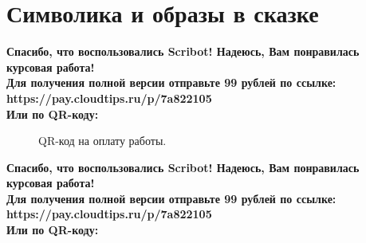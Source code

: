 \documentclass{article}
\begin{document}
\section{Символика и образы в сказке}
\begin{center}
    \textbf{
        Спасибо, что воспользовались Scribot! Надеюсь, Вам понравилась курсовая работа!\\
        Для получения полной версии отправьте 99 рублей по ссылке:\\
        https://pay.cloudtips.ru/p/7a822105\\
        Или по QR-коду:\\
    }
\end{center}
\begin{figure}[h]
    \caption{QR-код на оплату работы.}
    \label{ris:image}
\end{figure}
\newpage
\begin{center}
    \textbf{
        Спасибо, что воспользовались Scribot! Надеюсь, Вам понравилась курсовая работа!\\
        Для получения полной версии отправьте 99 рублей по ссылке:\\
        https://pay.cloudtips.ru/p/7a822105\\
        Или по QR-коду:\\
    }
\end{center}
\end{document}

